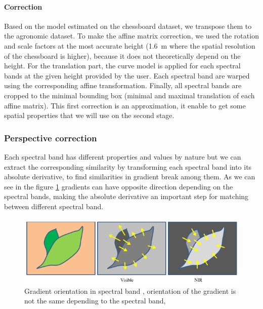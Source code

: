 \documentclass[]{elsarticle}
\begin{document}
	\paragraph{Correction}
	Based on the model estimated on the chessboard dataset, we transpose them to the agronomic dataset.
	To make the affine matrix correction, we used the rotation and scale factors at the most accurate height
	(\SI{1.6}{\meter} where the spatial resolution of the chessboard is higher), because it does not theoretically depend on the height.
	For the translation part, the curve model is applied for each spectral bands at the given height provided by the user.
	Each spectral band are warped using the corresponding affine transformation.
	Finally, all spectral bands are cropped to the minimal bounding box (minimal and maximal translation of each affine matrix).
	This first correction is an approximation, it enable to get some spatial properties that we will use on the second stage.
	
	\subsubsection{Perspective correction}
	
	
	Each spectral band has different properties and values by nature
	but we can extract the corresponding similarity by transforming each spectral band into its absolute derivative,
	to find similarities in gradient break among them.
	As we can see in the figure \ref{fig:vegetable-gradient}
	gradients can have opposite direction depending on the spectral bands,
	making the absolute derivative an important step for matching between different spectral band.
	
	\begin{figure}[H]
		\centering
		\includegraphics[width=0.6\linewidth]{../figures/contrast-inversion.png}
		\caption{
			Gradient orientation in spectral band \cite{rabatel:hal-01684135},
			orientation of the gradient is not the same depending to the spectral band,
		}
		\label{fig:vegetable-gradient}
	\end{figure}
	
\end{document}
